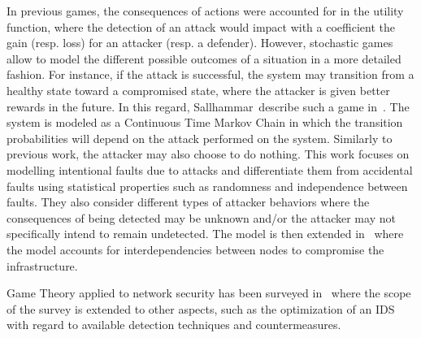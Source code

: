 In previous games, the consequences of actions were accounted for in the utility function, where the detection of an attack would impact with a coefficient the gain (resp. loss) for an attacker (resp. a defender).
However, stochastic games allow to model the different possible outcomes of a situation in a more detailed fashion.
For instance, if the attack is successful, the system may transition from a healthy state toward a compromised state, where the attacker is given better rewards in the future.
In this regard, Sallhammar~\etal describe such a game in~\cite{sallhammar2005}.
The system is modeled as a Continuous Time Markov Chain in which the transition probabilities will depend on the attack performed on the system. Similarly to previous work, the attacker may also choose to do nothing.
This work focuses on modelling intentional faults due to attacks and differentiate them from accidental faults using statistical properties such as randomness and independence between faults.
They also consider different types of attacker behaviors where the consequences of being detected may be unknown and/or the attacker may not specifically intend to remain undetected.
The model is then extended in~\cite{Nguyen2009} where the model accounts for interdependencies between nodes to compromise the infrastructure.

Game Theory applied to network security has been surveyed in~\cite{Roy2010,Kiennert2018} where the scope of the survey is extended to other aspects, such as the optimization of an IDS with regard to available detection techniques and countermeasures.
 

